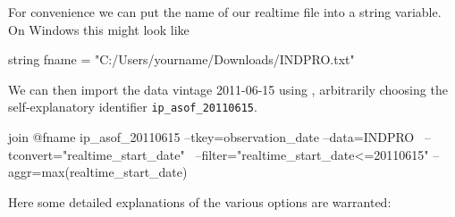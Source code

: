 For convenience we can put the name of our realtime file into a
string variable. On Windows this might look like
\begin{code}
string fname = "C:/Users/yourname/Downloads/INDPRO.txt"
\end{code}

We can then import the data vintage 2011-06-15 using ,
arbitrarily choosing the self-explanatory identifier
\texttt{ip\_asof\_20110615}.

\begin{code}
join @fname ip_asof_20110615 --tkey=observation_date --data=INDPRO \
--tconvert="realtime_start_date" \
--filter="realtime_start_date<=20110615" --aggr=max(realtime_start_date)
\end{code}

Here some detailed explanations of the various options are warranted: 
